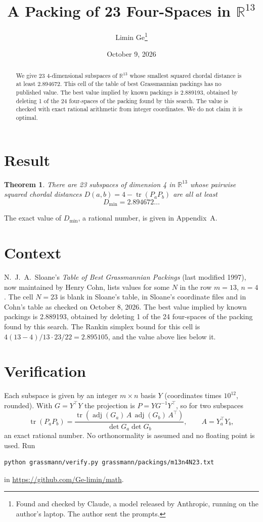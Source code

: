 \documentclass[11pt,a4paper]{article}
\title{A Packing of 23 Four-Spaces in $\mathbb{R}^{13}$}
\author{Limin Ge\thanks{Found and checked by Claude, a model released by Anthropic, running on the author's laptop. The author sent the prompts.}}
\date{October 9, 2026}
\newtheorem*{theorem}{Theorem}
\begin{document}
\maketitle
\begin{abstract}
We give 23 4-dimensional subspaces of $\mathbb{R}^{13}$ whose smallest squared chordal distance is at least 2.894672. This cell of the table of best Grassmannian packings has no published value. The best value implied by known packings is 2.889193, obtained by deleting 1 of the 24 four-spaces of the packing found by this search. The value is checked with exact rational arithmetic from integer coordinates. We do not claim it is optimal.
\end{abstract}

\section{Result}
\begin{theorem}
There are 23 subspaces of dimension 4 in $\mathbb{R}^{13}$ whose pairwise squared chordal distances $D(a,b) = 4 - \operatorname{tr}(P_aP_b)$ are all at least
\[ D_{\min} = 2.894672\ldots \]
\end{theorem}
The exact value of $D_{\min}$, a rational number, is given in Appendix~A.


\section{Context}
N.~J.~A.~Sloane's \emph{Table of Best Grassmannian Packings} (last modified 1997), now maintained by Henry Cohn, lists values for some $N$ in the row $m=13$, $n=4$. The cell $N=23$ is blank in Sloane's table, in Sloane's coordinate files and in Cohn's table as checked on October 8, 2026. The best value implied by known packings is 2.889193, obtained by deleting 1 of the 24 four-spaces of the packing found by this search. The Rankin simplex bound for this cell is $4(13-4)/13\cdot 23/22 = 2.895105$, and the value above lies below it.


\section{Verification}
Each subspace is given by an integer $m\times n$ basis $Y$ (coordinates times $10^{12}$, rounded). With $G=Y^\top Y$ the projection is $P=YG^{-1}Y^\top$, so for two subspaces
\[ \operatorname{tr}(P_aP_b)=\frac{\operatorname{tr}(\operatorname{adj}(G_a)\,A\,\operatorname{adj}(G_b)\,A^\top)}{\det G_a\det G_b},\qquad A=Y_a^\top Y_b, \]
an exact rational number. No orthonormality is assumed and no floating point is used. Run
\begin{verbatim}
python grassmann/verify.py grassmann/packings/m13n4N23.txt
\end{verbatim}
in \url{https://github.com/Ge-limin/math}.
\end{document}
